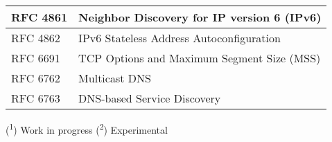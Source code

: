 \begin{longtable}{ | l | p{15cm} | }
RFC 4861 &
Neighbor Discovery for IP version 6 (IPv6) \\ \hline

RFC 4862 &
IPv6 Stateless Address Autoconfiguration \\ \hline

RFC 6691 &
TCP Options and Maximum Segment Size (MSS) \\ \hline

RFC 6762 &
Multicast DNS \\ \hline

RFC 6763 &
DNS-based Service Discovery \\ \hline

\end{longtable}

(\textsuperscript{1}) Work in progress
(\textsuperscript{2}) Experimental
